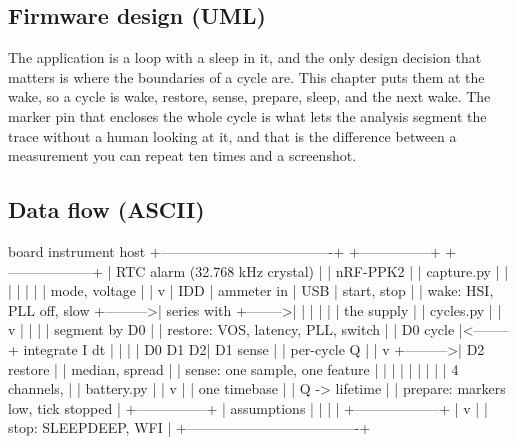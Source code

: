 \subsection*{Firmware design (UML)}


The application is a loop with a sleep in it, and the only design decision that
matters is where the boundaries of a cycle are. This chapter puts them at the
wake, so a cycle is wake, restore, sense, prepare, sleep, and the next wake. The
marker pin that encloses the whole cycle is what lets the analysis segment the
trace without a human looking at it, and that is the difference between a
measurement you can repeat ten times and a screenshot.

\subsection*{Data flow (ASCII)}

\begin{asciiart}
  board                                            instrument                host
  +-------------------------------------+          +---------------+         +------------------+
  | RTC alarm  (32.768 kHz crystal)     |          | nRF-PPK2      |         | capture.py       |
  |   |                                 |          |               |         |   mode, voltage  |
  |   v                                 |   IDD    | ammeter in    |  USB    |   start, stop    |
  | wake: HSI, PLL off, slow            +--------->| series with   +-------->|                  |
  |   |                                 |          | the supply    |         | cycles.py        |
  |   v                                 |          |               |         |   segment by D0  |
  | restore: VOS, latency, PLL, switch  |          | D0 cycle      |<--------+   integrate I dt |
  |   |                                 |  D0 D1 D2| D1 sense      |         |   per-cycle Q    |
  |   v                                 +--------->| D2 restore    |         |   median, spread |
  | sense: one sample, one feature      |          |               |         |                  |
  |   |                                 |          | 4 channels,   |         | battery.py       |
  |   v                                 |          | one timebase  |         |   Q -> lifetime  |
  | prepare: markers low, tick stopped  |          +---------------+         |   assumptions    |
  |   |                                 |                                    +------------------+
  |   v                                 |
  | stop: SLEEPDEEP, WFI                |
  +-------------------------------------+
\end{asciiart}

